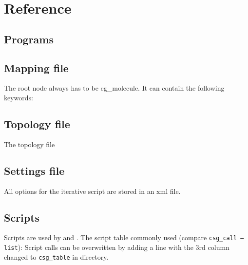 \chapter{Reference}
\section{Programs}
\label{sec:ref_programs}
%
\section{Mapping file}
\label{sec:ref_mapping}
The root node always has to be cg\_molecule. It can contain the following keywords:

%

\section{Topology file}
\label{sec:ref_topology}
The \xml topology file

%

\section{Settings file}
All options for the iterative script are stored in an xml file.
\label{sec:ref_options}
%
\vfill

\section{Scripts}
\label{sec:csg_table}
Scripts are used by  and .
The script table commonly used (compare \texttt{csg\_call --list}): 
%
Script calls can be overwritten by adding a line with the 3rd column changed to \texttt{csg\_table} in  directory.
%
